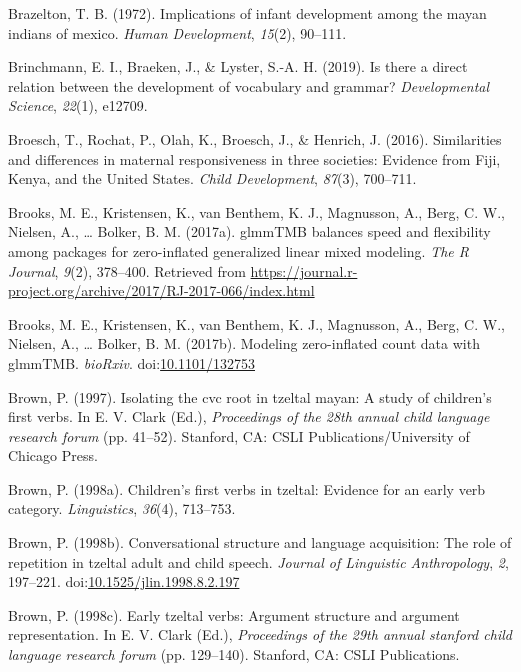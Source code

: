 \documentclass[floatsintext,man]{apa6}
\theoremstyle{definition}
\theoremstyle{definition}
\theoremstyle{definition}
\theoremstyle{remark}
\begin{document}
\hypertarget{ref-brazelton1972implications}{}
Brazelton, T. B. (1972). Implications of infant development among the
mayan indians of mexico. \emph{Human Development}, \emph{15}(2),
90--111.

\hypertarget{ref-brinchmann2019direct}{}
Brinchmann, E. I., Braeken, J., \& Lyster, S.-A. H. (2019). Is there a
direct relation between the development of vocabulary and grammar?
\emph{Developmental Science}, \emph{22}(1), e12709.

\hypertarget{ref-broesch2016similarities}{}
Broesch, T., Rochat, P., Olah, K., Broesch, J., \& Henrich, J. (2016).
Similarities and differences in maternal responsiveness in three
societies: Evidence from Fiji, Kenya, and the United States. \emph{Child
Development}, \emph{87}(3), 700--711.

\hypertarget{ref-R-glmmTMB}{}
Brooks, M. E., Kristensen, K., van Benthem, K. J., Magnusson, A., Berg,
C. W., Nielsen, A., \ldots{} Bolker, B. M. (2017a). glmmTMB balances
speed and flexibility among packages for zero-inflated generalized
linear mixed modeling. \emph{The R Journal}, \emph{9}(2), 378--400.
Retrieved from
\url{https://journal.r-project.org/archive/2017/RJ-2017-066/index.html}

\hypertarget{ref-brooks2017modeling}{}
Brooks, M. E., Kristensen, K., van Benthem, K. J., Magnusson, A., Berg,
C. W., Nielsen, A., \ldots{} Bolker, B. M. (2017b). Modeling
zero-inflated count data with glmmTMB. \emph{bioRxiv}.
doi:\href{https://doi.org/10.1101/132753}{10.1101/132753}

\hypertarget{ref-brown1997isolating}{}
Brown, P. (1997). Isolating the cvc root in tzeltal mayan: A study of
children's first verbs. In E. V. Clark (Ed.), \emph{Proceedings of the
28th annual child language research forum} (pp. 41--52). Stanford, CA:
CSLI Publications/University of Chicago Press.

\hypertarget{ref-brown1998childrens}{}
Brown, P. (1998a). Children's first verbs in tzeltal: Evidence for an
early verb category. \emph{Linguistics}, \emph{36}(4), 713--753.

\hypertarget{ref-brown1998conversational}{}
Brown, P. (1998b). Conversational structure and language acquisition:
The role of repetition in tzeltal adult and child speech. \emph{Journal
of Linguistic Anthropology}, \emph{2}, 197--221.
doi:\href{https://doi.org/10.1525/jlin.1998.8.2.197}{10.1525/jlin.1998.8.2.197}

\hypertarget{ref-brown1998early}{}
Brown, P. (1998c). Early tzeltal verbs: Argument structure and argument
representation. In E. V. Clark (Ed.), \emph{Proceedings of the 29th
annual stanford child language research forum} (pp. 129--140). Stanford,
CA: CSLI Publications.
\end{document}

